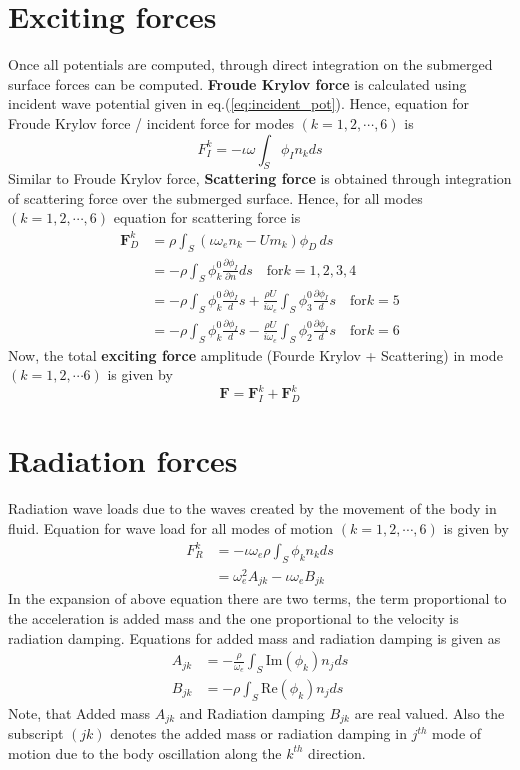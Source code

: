 \section{Exciting forces}
Once all potentials are computed, through direct integration on the submerged surface forces 
can be computed.
{\bf Froude Krylov force} is calculated using incident wave potential given in eq.(\ref{eq:incident_pot}). Hence, 
equation for Froude Krylov force / incident force for modes $(k=1, 2, \cdots, 6)$ is 
\begin{equation}
    F_I^k = -\iota \omega\int_{S} \phi_I n_k ds
\end{equation}
Similar to Froude Krylov force, {\bf Scattering force} is obtained through integration of scattering force over the 
submerged surface. Hence, for all modes $(k=1, 2, \cdots, 6)$ equation for scattering force is 
\begin{align}
    \boldsymbol{F}_D^k &= \rho \int_{S}(\iota \omega_e n_k - Um_k)\phi_D\,ds \\ \nonumber
    &= -\rho \int_{S}\phi_k^0\frac{\partial \phi_I}{\partial n} ds \quad \text{for} k=1, 2, 3, 4 \\ \nonumber 
    &= -\rho \int_{S}\phi_k^0\frac{\partial \phi_I} ds + \frac{\rho U}{i\omega_e}\int_{S}\phi^0_3 
    \frac{\partial \phi_I} ds \quad \text{for} k=5 \\ \nonumber
    &= -\rho \int_{S}\phi_k^0\frac{\partial \phi_I} ds - \frac{\rho U}{i\omega_e}\int_{S}\phi^0_2
    \frac{\partial \phi_I} ds \quad \text{for} k=6
\end{align}
Now, the total {\bf exciting force} amplitude (Fourde Krylov + Scattering) in mode $(k=1, 2, \cdots 6)$ is given by 
\begin{equation}
    \boldsymbol{F} = \boldsymbol{F}^k_I + \boldsymbol{F}^k_D 
\end{equation}
\section{Radiation forces}
Radiation wave loads due to the waves created by the movement of the body in 
fluid. Equation for wave load for all modes of motion $(k=1, 2, \cdots, 6)$ is given by 
\begin{align}
    F_R^k &= -\iota \omega_e \rho \int_{S}\phi_k n_k ds \\ \nonumber
          &= \omega_e^2 A_{jk} - \iota \omega_e B_{jk}
\end{align}
In the expansion of above equation there are two terms, the term proportional to the acceleration is 
added mass and the one proportional to the velocity is radiation damping. Equations for added mass and
radiation damping is given as 
\begin{align}
    A_{jk} &= -\frac{\rho}{\omega_e}\int_{S}\text{Im}(\phi_k) n_j ds \\ 
    B_{jk} &= -\rho \int_{S} \text{Re}(\phi_k)n_j ds 
\end{align}
Note, that Added mass $A_{jk}$ and Radiation damping $B_{jk}$ are real valued. Also the subscript $(jk)$ denotes
the added mass or radiation damping in $j^{th}$ mode of motion due to the body oscillation along the 
$k^{th}$ direction.

